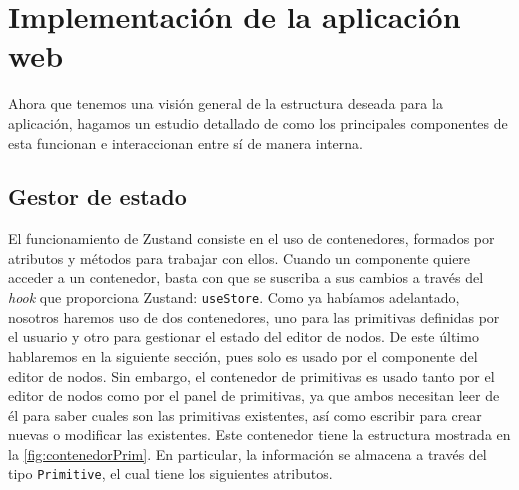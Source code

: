\section{Implementación de la aplicación web}
Ahora que tenemos una visión general de la estructura deseada para la aplicación, hagamos un estudio detallado de como los principales componentes de esta funcionan e interaccionan entre sí de manera interna.

\subsection{Gestor de estado}
El funcionamiento de Zustand consiste en el uso de contenedores, formados por atributos y métodos para trabajar con ellos. Cuando un componente quiere acceder a un contenedor, basta con que se suscriba a sus cambios a través del \textit{hook} que proporciona Zustand: \texttt{useStore}. Como ya habíamos adelantado, nosotros haremos uso de dos contenedores, uno para las primitivas definidas por el usuario y otro para gestionar el estado del editor de nodos. De este último hablaremos en la siguiente sección, pues solo es usado por el componente del editor de nodos. Sin embargo, el contenedor de primitivas es usado tanto por el editor de nodos como por el panel de primitivas, ya que ambos necesitan leer de él para saber cuales son las primitivas existentes, así como escribir para crear nuevas o modificar las existentes. Este contenedor tiene la estructura mostrada en la \autoref{fig:contenedorPrim}. En particular, la información se almacena a través del tipo \texttt{Primitive}, el cual tiene los siguientes atributos.

